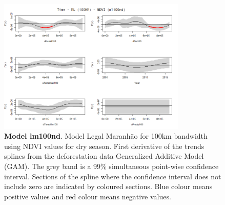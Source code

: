 \begin{table}

\begin{figure}[H]
 \centering
        \centering
        \includegraphics[width=0.8\textwidth]{ml100nd.png} %
        \caption[Model Legal Maranhão for 100km bandwidth using NDVI values for dry season. First derivative of the trends splines from the deforestation data Generalized Additive Model (GAM)]{\textbf{Model lm100nd}. Model Legal Maranhão for 100km bandwidth using NDVI values for dry season. First derivative of the trends splines from the deforestation data Generalized Additive Model (GAM). The grey band is a 99\% simultaneous point-wise confidence interval. Sections of the spline where the confidence interval does not include zero are indicated by coloured sections. Blue colour means positive values and red colour means negative values.}
        \centering
\end{figure}
\end{table}

